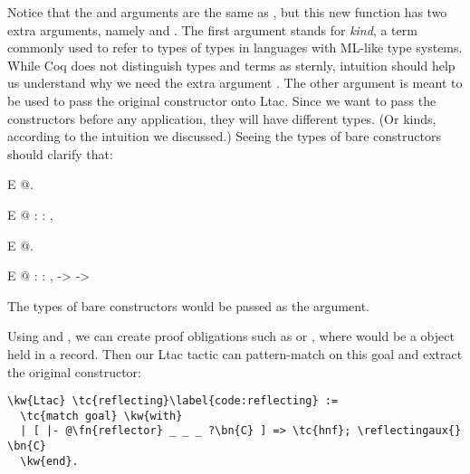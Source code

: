 Notice that the  and  arguments are the same as , but this new function has two extra arguments, namely  and . The first argument  stands for \emph{kind}, a term commonly used to refer to types of types in languages with ML-like type systems. While Coq does not distinguish types and terms as sternly, intuition should help us understand why we need the extra argument . The other argument  is meant to be used to pass the original constructor onto \gls{Ltac}. Since we want to pass the constructors before any application, they will have different types. (Or kinds, according to the intuition we discussed.) Seeing the types of bare constructors should clarify that:

\vspace{.2in}
\begin{SaveVerbatim}{E}
 @.
\end{SaveVerbatim}

\begin{SaveVerbatim}{E}
@
     :   : ,  
\end{SaveVerbatim}

\vspace{.1in}
\begin{SaveVerbatim}{E}
 @.
\end{SaveVerbatim}

\begin{SaveVerbatim}{E}
@
     :   : ,  ->   ->  
\end{SaveVerbatim}

The types of bare constructors would be passed as the  argument.

Using  and , we can create proof obligations such as  or , where \ctorreified{} would be a \reified{} object held in a \ctordesc{} record. Then our \gls{Ltac} tactic can pattern-match on this goal and extract the original constructor:

\newcommand{\reflecting}{\hyperref[code:reflecting]{\tc{reflecting}}}
\newcommand{\buildctor}{\hyperref[code:buildctor]{\tc{build\_\linebreak[0]ctor}}}
\newcommand{\reflectingaux}{\hyperref[code:reflectingaux]{\tc{reflecting\_\linebreak[0]aux}}}
\begin{Verbatim}
\kw{Ltac} \tc{reflecting}\label{code:reflecting} :=
  \tc{match goal} \kw{with}
  | [ |- @\fn{reflector} _ _ _ ?\bn{C} ] => \tc{hnf}; \reflectingaux{} \bn{C}
  \kw{end}.
\end{Verbatim}

